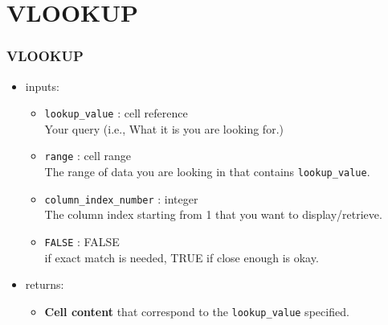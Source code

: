 \documentclass[12pt]{beamer}
\begin{document}
\section{VLOOKUP}
\begin{frame}
	\frametitle{VLOOKUP}
	\begin{itemize}
		\item inputs: 
			\begin{itemize}
				\item \texttt{lookup\_value} : cell reference\\
				Your query (i.e., What it is you are looking for.) 
				\item \texttt{range} : cell range\\
				The range of data you are looking in that contains \texttt{lookup\_value}.
				\item \texttt{column\_index\_number} : integer\\
				The column index starting from 1 that you want to display/retrieve.
				\item \texttt{FALSE} : FALSE\\ if exact match is needed, TRUE if close enough is okay.
			\end{itemize}
		\item returns:
		\begin{itemize}
			\item \textbf{Cell content} that correspond to the \texttt{lookup\_value} specified. 
		\end{itemize}
		\end{itemize}
\end{frame}
\end{document}
